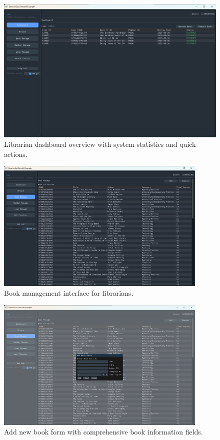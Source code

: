 \begin{figure}[H]
	\centering
	\includegraphics[width=\textwidth]{figures/screenshot_librarian_dashboard.png}
	\caption{Librarian dashboard overview with system statistics and quick actions.}
	\label{fig:ss_librarian_dashboard}
\end{figure}

\begin{figure}[H]
	\centering
	\includegraphics[width=0.9\textwidth]{figures/screenshot_librarian_bookmanage.png}
	\caption{Book management interface for librarians.}
	\label{fig:ss_librarian_bookmanage}
\end{figure}

\begin{figure}[H]
	\centering
	\includegraphics[width=0.9\textwidth]{figures/screenshot_librarian_addbook.png}
	\caption{Add new book form with comprehensive book information fields.}
	\label{fig:ss_librarian_addbook}
\end{figure}


